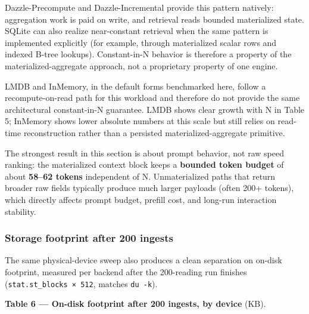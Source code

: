 Dazzle-Precompute and Dazzle-Incremental provide this pattern natively:
aggregation work is paid on write, and retrieval reads bounded materialized
state. SQLite can also realize near-constant retrieval when the same pattern is
implemented explicitly (for example, through materialized scalar rows and
indexed B-tree lookups). Constant-in-N behavior is therefore a property of the
materialized-aggregate approach, not a proprietary property of one engine.

LMDB and InMemory, in the default forms benchmarked here, follow a
recompute-on-read path for this workload and therefore do not provide the same
architectural constant-in-N guarantee. LMDB shows clear growth with N in Table
5; InMemory shows lower absolute numbers at this scale but still relies on
read-time reconstruction rather than a persisted materialized-aggregate
primitive.

The strongest result in this section is about prompt behavior, not raw speed
ranking: the materialized context block keeps a \textbf{bounded token budget} of
about \textbf{58--62 tokens} independent of N. Unmaterialized paths that return
broader raw fields typically produce much larger payloads (often 200+ tokens),
which directly affects prompt budget, prefill cost, and long-run interaction
stability.

\subsubsection{Storage footprint after 200
ingests}\label{storage-footprint-after-200-ingests}

The same physical-device sweep also produces a clean separation on on-disk
footprint, measured per backend after the 200-reading run finishes
(\texttt{stat.st\_blocks\ ×\ 512}, matches \texttt{du\ -k}).

\textbf{Table 6 --- On-disk footprint after 200 ingests, by device} (KB).


